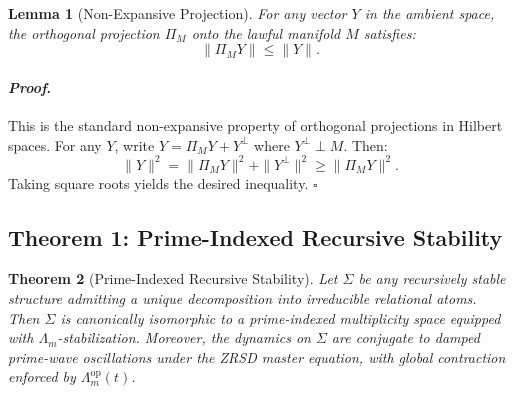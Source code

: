 \documentclass[12pt]{article}
\theoremstyle{plain}
\newtheorem{theorem}{Theorem}[section]
\newtheorem{lemma}[theorem]{Lemma}
\theoremstyle{definition}
\theoremstyle{remark}
\renewenvironment{proof}{\paragraph{\textit{Proof}.}}{\hfill$\square$}
\begin{document}
\begin{lemma}[Non-Expansive Projection]
\label{lem:projection}
For any vector $Y$ in the ambient space, the orthogonal projection $\Pi_M$ onto the lawful manifold $M$ satisfies:
\[
\|\Pi_M Y\| \leq \|Y\|.
\]
\end{lemma}

\begin{proof}
This is the standard non-expansive property of orthogonal projections in Hilbert spaces. For any $Y$, write $Y = \Pi_M Y + Y^\perp$ where $Y^\perp \perp M$. Then:
\[
\|Y\|^2 = \|\Pi_M Y\|^2 + \|Y^\perp\|^2 \geq \|\Pi_M Y\|^2.
\]
Taking square roots yields the desired inequality.
\end{proof}

\subsection{Theorem 1: Prime-Indexed Recursive Stability}

\begin{theorem}[Prime-Indexed Recursive Stability]
\label{thm:stability}
Let $\Sigma$ be any recursively stable structure admitting a unique decomposition into irreducible relational atoms. Then $\Sigma$ is canonically isomorphic to a prime-indexed multiplicity space equipped with $\Lambda_m$-stabilization. Moreover, the dynamics on $\Sigma$ are conjugate to damped prime-wave oscillations under the ZRSD master equation, with global contraction enforced by $\Lambda_m^{\text{op}}(t)$.
\end{theorem}
\end{document}
